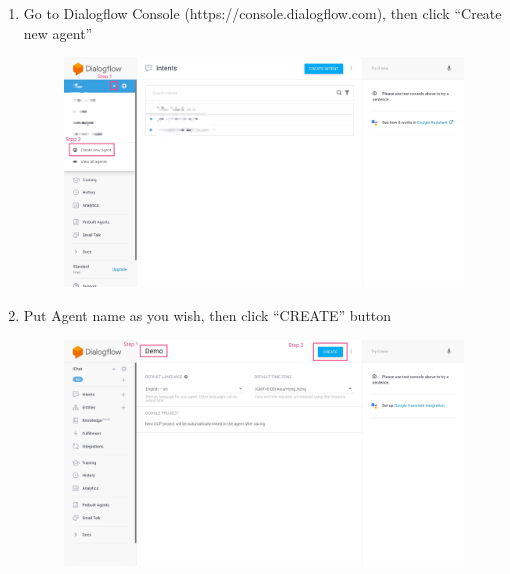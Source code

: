 \begin{enumerate}

	\item Go to Dialogflow Console (https://console.dialogflow.com), then click “Create new agent”

	\begin{figure}[H]
		\centering
		\includegraphics[width=\linewidth, frame]{img/manual_1.jpg}
	\end{figure}

	\item Put Agent name as you wish, then click “CREATE” button

	\begin{figure}[H]
		\centering
		\includegraphics[width=\linewidth, frame]{img/manual_2.jpg}
	\end{figure}


\end{enumerate}
